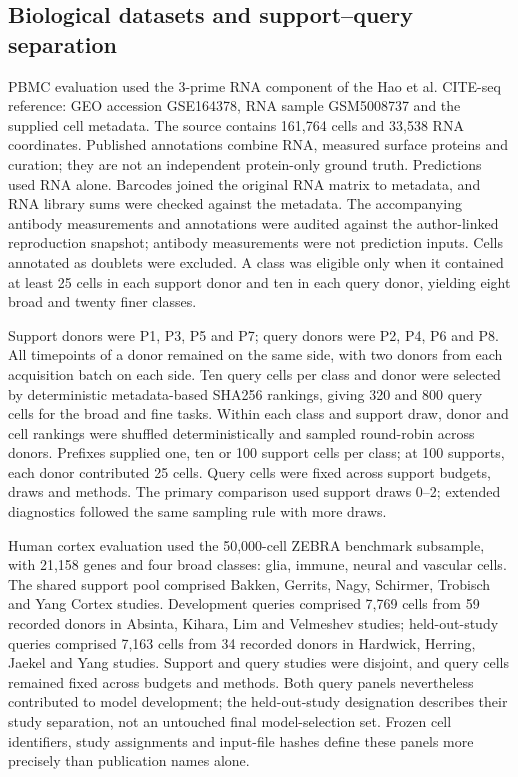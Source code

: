 \subsection*{Biological datasets and support--query separation}

PBMC evaluation used the 3-prime RNA component of the Hao et al. CITE-seq reference\cite{hao2021multimodal}: GEO accession GSE164378, RNA sample GSM5008737 and the supplied cell metadata. The source contains 161,764 cells and 33,538 RNA coordinates. Published annotations combine RNA, measured surface proteins and curation; they are not an independent protein-only ground truth. Predictions used RNA alone. Barcodes joined the original RNA matrix to metadata, and RNA library sums were checked against the metadata. The accompanying antibody measurements and annotations were audited against the author-linked reproduction snapshot; antibody measurements were not prediction inputs. Cells annotated as doublets were excluded. A class was eligible only when it contained at least 25 cells in each support donor and ten in each query donor, yielding eight broad and twenty finer classes.

Support donors were P1, P3, P5 and P7; query donors were P2, P4, P6 and P8. All timepoints of a donor remained on the same side, with two donors from each acquisition batch on each side. Ten query cells per class and donor were selected by deterministic metadata-based SHA256 rankings, giving 320 and 800 query cells for the broad and fine tasks. Within each class and support draw, donor and cell rankings were shuffled deterministically and sampled round-robin across donors. Prefixes supplied one, ten or 100 support cells per class; at 100 supports, each donor contributed 25 cells. Query cells were fixed across support budgets, draws and methods. The primary comparison used support draws 0--2; extended diagnostics followed the same sampling rule with more draws.

Human cortex evaluation used the 50,000-cell ZEBRA benchmark subsample\cite{flotho2024zebra}, with 21,158 genes and four broad classes: glia, immune, neural and vascular cells. The shared support pool comprised Bakken, Gerrits, Nagy, Schirmer, Trobisch and Yang Cortex studies. Development queries comprised 7,769 cells from 59 recorded donors in Absinta, Kihara, Lim and Velmeshev studies; held-out-study queries comprised 7,163 cells from 34 recorded donors in Hardwick, Herring, Jaekel and Yang studies. Support and query studies were disjoint, and query cells remained fixed across budgets and methods. Both query panels nevertheless contributed to model development; the held-out-study designation describes their study separation, not an untouched final model-selection set. Frozen cell identifiers, study assignments and input-file hashes define these panels more precisely than publication names alone.

